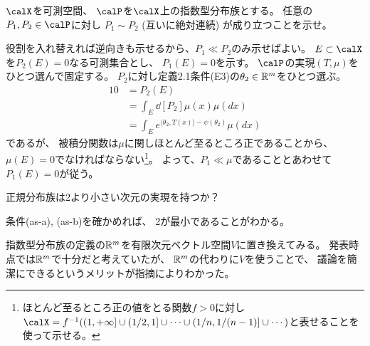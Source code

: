 \documentclass[report]{jlreq}
\begin{document}
\begin{problem}
    $\calX$を可測空間、
    $\calP$を$\calX$上の指数型分布族とする。
    任意の$P_1, P_2 \in \calP$に対し
    $P_1 \sim P_2$ (互いに絶対連続) が成り立つことを示せ。
\end{problem}

\begin{answer}
    役割を入れ替えれば逆向きも示せるから、$P_1 \ll P_2$のみ示せばよい。
    $E \subset \calX$を$P_2(E) = 0$なる可測集合とし、
    $P_1(E) = 0$を示す。
    $\calP$の実現$(T, \mu)$をひとつ選んで固定する。
    $P_2$に対し定義2.1条件(E3)の$\theta_2 \in \mathbb{R}^m$をひとつ選ぶ。
    \begin{alignat}{1}
        0
            &= P_2(E) \\
            &= \int_E \dd[P_2]{\mu}(x) \mu(dx) \\
            &= \int_E e^{\langle \theta_2, T(x) \rangle - \psi(\theta_2)} \mu(dx)
    \end{alignat}
    であるが、
    被積分関数は$\mu$に関しほとんど至るところ正であることから、
    $\mu(E) = 0$でなければならない\footnote{
        ほとんど至るところ正の値をとる関数$f > 0$に対し
        $\calX = f^{-1}(
            (1, +\infty]
            \cup (1/2, 1]
            \cup \cdots
            \cup (1/n, 1/(n - 1)]
            \cup \cdots
        )$と表せることを使って示せる。
    }。
    よって、$P_1 \ll \mu$であることとあわせて
    $P_1(E) = 0$が従う。
\end{answer}

\begin{problem}
    正規分布族は2より小さい次元の実現を持つか？
\end{problem}

\begin{answer}
    条件(as-a), (as-b)を確かめれば、
    2が最小であることがわかる。
    \TODO{}
\end{answer}

指数型分布族の定義の$\mathbb{R}^m$を有限次元ベクトル空間$V$に置き換えてみる。
発表時点では$\mathbb{R}^m$で十分だと考えていたが、
$\mathbb{R}^m$の代わりに$V$を使うことで、
議論を簡潔にできるというメリットが指摘によりわかった。
\end{document}
